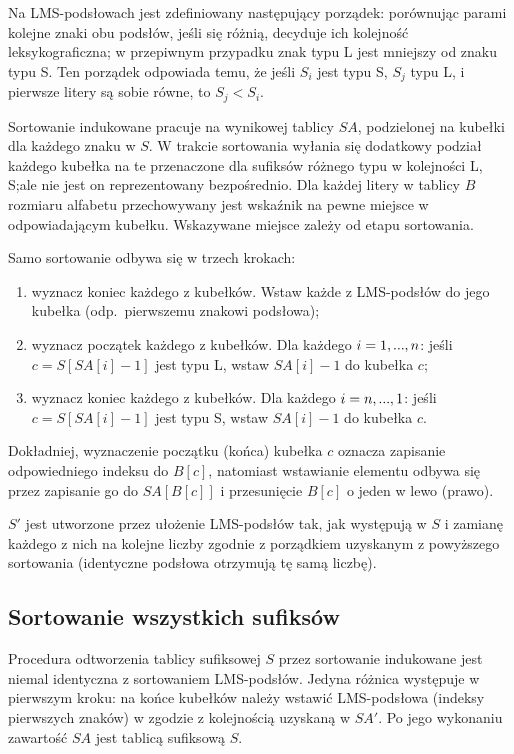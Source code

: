 \documentclass[12pt]{article}
\newcommand{\elps}{\makebox[.8em][c]{.\hfil.\hfil.}}
\begin{document}
Na LMS-podsłowach jest zdefiniowany następujący porządek: porównując parami
kolejne znaki obu podsłów, jeśli się różnią, decyduje ich kolejność
leksykograficzna; w przepiwnym przypadku znak typu L jest mniejszy od znaku
typu S. Ten porządek odpowiada temu, że jeśli $S_i$ jest typu S, $S_j$ typu L,
i pierwsze litery są sobie równe, to $S_j < S_i$.

Sortowanie indukowane pracuje na wynikowej tablicy $SA$, podzielonej
na kubełki dla każdego znaku w $S$. W trakcie sortowania wyłania się dodatkowy
podział każdego kubełka na te przenaczone dla sufiksów różnego typu w
kolejności L, S;\@ ale nie jest on reprezentowany bezpośrednio. Dla każdej
litery w tablicy $B$ rozmiaru alfabetu przechowywany jest wskaźnik na pewne
miejsce w odpowiadającym kubełku. Wskazywane miejsce zależy od etapu
sortowania.

Samo sortowanie odbywa się w trzech krokach:

\begin{enumerate}
	\item wyznacz koniec każdego z kubełków. Wstaw każde z LMS-podsłów do jego
		kubełka (odp.\ pierwszemu znakowi podsłowa);
	\item wyznacz początek każdego z kubełków. Dla każdego $i = 1, \elps, n$:
		jeśli $c = S[SA[i] - 1]$ jest typu L, wstaw $SA[i] - 1$ do kubełka $c$;
	\item wyznacz koniec każdego z kubełków. Dla każdego $i = n, \elps, 1$:
		jeśli $c = S[SA[i] - 1]$ jest typu S, wstaw $SA[i] - 1$ do kubełka $c$.
\end{enumerate}

Dokładniej, wyznaczenie początku (końca) kubełka $c$ oznacza zapisanie
odpowiedniego indeksu do $B[c]$, natomiast wstawianie elementu odbywa się przez
zapisanie go do $SA[B[c]]$ i przesunięcie $B[c]$ o jeden w lewo (prawo).

$S'$ jest utworzone przez ułożenie LMS-podsłów tak, jak występują w $S$ i
zamianę każdego z nich na kolejne liczby zgodnie z porządkiem uzyskanym z
powyższego sortowania (identyczne podsłowa otrzymują tę samą liczbę).

\subsection*{Sortowanie wszystkich sufiksów}

Procedura odtworzenia tablicy sufiksowej $S$ przez sortowanie indukowane jest
niemal identyczna z sortowaniem LMS-podsłów.  Jedyna różnica występuje w
pierwszym kroku: na końce kubełków należy wstawić LMS-podsłowa (indeksy
pierwszych znaków) w zgodzie z kolejnością uzyskaną w $SA'$. Po jego wykonaniu
zawartość $SA$ jest tablicą sufiksową $S$.
\end{document}
